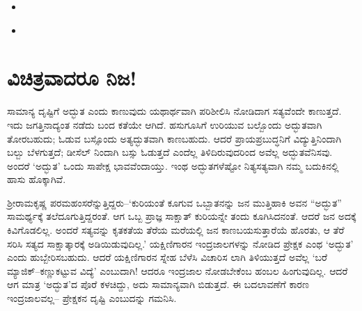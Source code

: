 \begin{itemize}
 \item {}\\
\begin{flushright}
\end{flushright}

 \item {}\\
\begin{flushright}
\end{flushright}

\end{itemize}


\section{ವಿಚಿತ್ರವಾದರೂ ನಿಜ!}

ಸಾಮಾನ್ಯ ದೃಷ್ಟಿಗೆ ಅದ್ಭುತ ಎಂದು ಕಾಣುವುದು ಯಥಾರ್ಥವಾಗಿ ಪರಿಶೀಲಿಸಿ ನೋಡಿದಾಗ ಸತ್ಯವೆಂದೇ ಕಾಣುತ್ತದೆ. ಇದು ಜಗತ್ತಿನಾದ್ಯಂತ ನಡೆದು ಬಂದ ಕತೆಯೇ ಆಗಿದೆ. ಹಸುಗೂಸಿಗೆ ಉರಿಯುವ ಬಲ್ಬೊಂದು ಅದ್ಭುತವಾಗಿ ತೋರಬಹುದು; ಓಡುವ ಬಸ್ಸೊಂದು ಅತ್ಯದ್ಭುತವಾಗಿ ಕಾಣಬಹುದು. ಆದರೆ ಪ್ರಾಯಪ್ರಬುದ್ಧನಿಗೆ ವಿದ್ಯುತ್ತಿನಿಂದಾಗಿ ಬಲ್ಬು ಬೆಳಗುತ್ತದೆ; ಡೀಸೆಲ್ ನಿಂದಾಗಿ ಬಸ್ಸು ಓಡುತ್ತದೆ ಎಂದೆಲ್ಲ ತಿಳಿದಿರುವುದರಿಂದ ಅವೆಲ್ಲ ಅದ್ಭುತವೆನಿಸವು. ಅಂದರೆ ‘ಅದ್ಭುತ’ ಒಂದು ಸಾಪೇಕ್ಷ ಭಾವವೆಂದಾಯ್ತು. ಇಂಥ ಅದ್ಭುತಗಳೆಷ್ಟೋ ನಿತ್ಯಸತ್ಯವಾಗಿ ನಮ್ಮ ಬದುಕಿನಲ್ಲಿ ಹಾಸು ಹೊಕ್ಕಾಗಿವೆ.

ಶ‍್ರೀರಾಮಕೃಷ್ಣ ಪರಮಹಂಸರೆನ್ನುತ್ತಿದ್ದರು–‘ಕುರಿಯಂತೆ ಕೂಗುವ ಒಬ್ಬಾತನನ್ನು ಜನ ಮುತ್ತಿಹಾಕಿ ಅವನ “ಅದ್ಭುತ” ಸಾಮರ್ಥ್ಯಕ್ಕೆ ತಲೆದೂಗುತ್ತಿದ್ದರಂತೆ. ಆಗ ಒಬ್ಬ ಪ್ರಾಜ್ಞ ಸಾಕ್ಷಾತ್ ಕುರಿಯನ್ನೇ ತಂದು ಕೂಗಿಸಿದನಂತೆ. ಆದರೆ ಜನ ಅದಕ್ಕೆ ಕಿವಿಗೊಡಲಿಲ್ಲ. ಅಂದರೆ ಸತ್ಯವನ್ನು ಕೃತಕತೆಯ ತೆರೆಯ ಮರೆಯಲ್ಲಿ ಜನ ಕಾಣಬಯಸುತ್ತಾರೆಯೆ ಹೊರತು, ಆ ತೆರೆ ಸರಿಸಿ ಸತ್ಯದ ಸಾಕ್ಷಾತ್ಕಾರಕ್ಕೆ ಅಡಿಯಿಡುವುದಿಲ್ಲ.’ ಯಕ್ಷಿಣಿಗಾರನ ಇಂದ್ರಜಾಲಗಳನ್ನು ನೋಡಿದ ಪ್ರೇಕ್ಷಕ ಎಂಥ ‘ಅದ್ಭುತ’ ಎಂದು ಹುಬ್ಬೇರಿಸಬಹುದು. ಆದರೆ ಯಕ್ಷಿಣಿಗಾರನ ಸ್ನೇಹ ಬೆಳೆಸಿ ವಿಚಾರಿಸ ಲಾಗಿ ತಿಳಿಯುತ್ತದೆ ಅವೆಲ್ಲ ‘ಬರೆ ಮ್ಯಾಜಿಕ್​–ಕಣ್ಣುಕಟ್ಟುವ ವಿದ್ಯೆ’ ಎಂಬುದಾಗಿ! ಆದರೂ ಇಂದ್ರಜಾಲ ನೋಡಬೇಕೆಂಬ ಹಂಬಲ ಹಿಂಗುವುದಿಲ್ಲ. ಆದರೆ ಆಗ ಮಾತ್ರ ‘ಅದ್ಭುತ’ದ ಪೊರೆ ಕಳಚಿದ್ದು, ಅದು ಸಾಮಾನ್ಯವಾಗಿ ಬಿಡುತ್ತದೆ. ಈ ಬದಲಾವಣೆಗೆ ಕಾರಣ ಇಂದ್ರಜಾಲವಲ್ಲ– ಪ್ರೇಕ್ಷಕನ ದೃಷ್ಟಿ ಎಂಬುದನ್ನು ಗಮನಿಸಿ.


